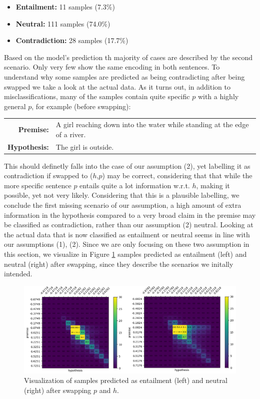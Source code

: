 \begin{itemize}
\item \textbf{Entailment:} 11 samples (7.3\%)
\item \textbf{Neutral:} 111 samples (74.0\%)
\item \textbf{Contradiction:} 28 samples (17.7\%)
\end{itemize}
Based on the model's prediction th majority of cases are described by the second scenario. Only very few show the same encoding in both sentences. To understand why some samples are predicted as being contradicting after being swapped we take a look at the actual data. As it turns out, in addition to misclassifications, many of the samples contain quite specific $p$ with a highly general $p$, for example (before swapping):
\begin{center}
\begin{tabular}{rl}
\textbf{Premise:} & A girl reaching down into the water while standing at the edge of a river. \\
\textbf{Hypothesis:} & The girl is outside.
\end{tabular}
\end{center}
This should definetly falls into the case of our assumption (2), yet labelling it as contradiction if swapped to ($h$,$p$) may be correct, considering that that while the more specific sentence $p$ entails quite a lot information w.r.t. $h$, making it possible, yet not very likely. Considering that this is a plausible labelling, we conclude the first missing scenario of our assumption, a high amount of extra information in the hypothesis compared to a very broad claim in the premise may be classified as contradiction, rather than our assumption (2) neutral. Looking at the actual data that is now classified as entailment or neutral seems in line with our assumptions (1), (2). Since we are only focusing on these two assumption in this section, we visualize in Figure \ref{fig:alignment_entailment_inversed} samples predicted as entailment (left) and neutral (right) after swapping, since they describe the scenarios we initally intended.
\begin{figure}[tph!]	\centering
\includegraphics[totalheight=7cm]{fig/alignment_entailment_inversed.png}
	\caption{Visualization of samples predicted as entailment (left) and neutral (right) after swapping $p$ and $h$.}
	\label{fig:alignment_entailment_inversed}
\end{figure}
